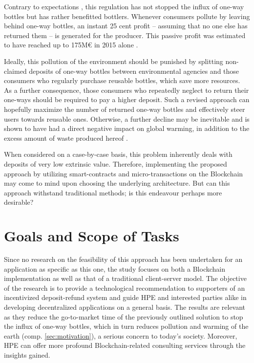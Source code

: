 Contrary to expectations \cite[§ 8]{verpackV}, this regulation has not stopped the influx of one-way bottles but has rather benefitted bottlers. Whenever consumers pollute by leaving behind one-way bottles, an instant 25 cent profit -- assuming that no one else has returned them -- is generated for the producer. This passive profit was estimated to have reached up to 175M\euro{} in 2015 alone \cite{mehrwegSystem}. 


Ideally, this pollution of the environment should be punished by splitting non-claimed deposits of one-way bottles between environmental agencies and those consumers who regularly purchase reusable bottles, which save more resources. As a further consequence, those consumers who repeatedly neglect to return their one-ways should be required to pay a higher deposit. Such a revised approach can hopefully maximize the number of returned one-way bottles and effectively steer users towards reusable ones. Otherwise, a further decline may be inevitable and is shown to have had a direct negative impact on global warming, in addition to the excess amount of waste produced hereof \cite{einwegUmweltbelastung}.

When considered on a case-by-case basis, this problem inherently deals with deposits of very low extrinsic value. Therefore, implementing the proposed approach by utilizing smart-contracts and micro-transactions on the Blockchain may come to mind upon choosing the underlying architecture. But can this approach withstand traditional methods; is this endeavour perhaps more desirable? 


\section{Goals and Scope of Tasks}
Since no research on the feasibility of this approach has been undertaken for an application as specific as this one, the study focuses on both a Blockchain implementation as well as that of a traditional client-server model. The objective of the research is to provide a technological recommendation to supporters of an incentivized deposit-refund system and guide \ac{HPE} and interested parties alike in developing decentralized applications on a general basis. The results are relevant as they reduce the go-to-market time of the previously outlined solution to stop the influx of one-way bottles, which in turn reduces pollution and warming of the earth (comp. \ref{sec:motivation}), a serious concern to today's society. Moreover, \ac{HPE} can offer more profound Blockchain-related consulting services through the insights gained.

